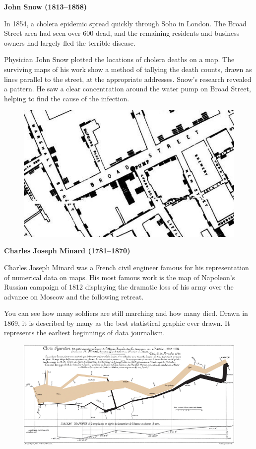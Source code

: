 \documentclass[]{book}
\theoremstyle{definition}
\theoremstyle{definition}
\theoremstyle{definition}
\theoremstyle{remark}
\begin{document}
\textbf{John Snow (1813--1858)}

In 1854, a cholera epidemic spread quickly through Soho in London. The
Broad Street area had seen over 600 dead, and the remaining residents
and business owners had largely fled the terrible disease.

Physician John Snow plotted the locations of cholera deaths on a map.
The surviving maps of his work show a method of tallying the death
counts, drawn as lines parallel to the street, at the appropriate
addresses. Snow's research revealed a pattern. He saw a clear
concentration around the water pump on Broad Street, helping to find the
cause of the infection.

\begin{figure}
\centering
\includegraphics{images/Snow.png}
\caption{}
\end{figure}

\textbf{Charles Joseph Minard (1781--1870)}

Charles Joseph Minard was a French civil engineer famous for his
representation of numerical data on maps. His most famous work is the
map of Napoleon's Russian campaign of 1812 displaying the dramatic loss
of his army over the advance on Moscow and the following retreat.

You can see how many soldiers are still marching and how many died.
Drawn in 1869, it is described by many as the best statistical graphic
ever drawn. It represents the earliest beginnings of data journalism.

\begin{figure}
\centering
\includegraphics{images/Minard.png}
\caption{}
\end{figure}
\end{document}
